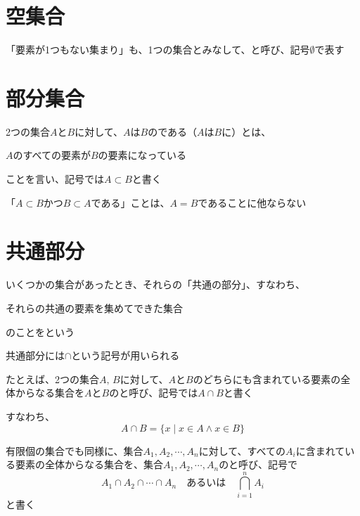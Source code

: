 \documentclass[../book_ronri-and-set]{subfiles}
\begin{document}
\sectionline
\section{空集合}

「要素が1つもない集まり」も、1つの集合とみなして、と呼び、記号$\emptyset$で表す

\sectionline
\section{部分集合}

2つの集合$A$と$B$に対して、$A$は$B$のである（$A$は$B$に）とは、
\begin{shaded*}
  $A$のすべての要素が$B$の要素になっている
\end{shaded*}
ことを言い、記号では$A \subset B$と書く

\br

「$A \subset B$かつ$B \subset A$である」ことは、$A = B$であることに他ならない

\sectionline
\section{共通部分}

いくつかの集合があったとき、それらの「共通の部分」、すなわち、
\begin{shaded*}
  それらの共通の要素を集めてできた集合
\end{shaded*}
のことをという

共通部分には$\cap$という記号が用いられる

\sectionline

たとえば、2つの集合$A,\,B$に対して、$A$と$B$のどちらにも含まれている要素の全体からなる集合を$A$と$B$のと呼び、記号では$A \cap B$と書く

\br

すなわち、
\begin{equation*}
  A \cap B = \{x \mid x \in A \land x \in B\}
\end{equation*}

\sectionline

有限個の集合でも同様に、集合$A_1, A_2, \cdots , A_n$に対して、すべての$A_i$に含まれている要素の全体からなる集合を、集合$A_1, A_2, \cdots , A_n$のと呼び、記号で
\begin{equation*}
  A_1 \cap A_2 \cap \cdots \cap A_n \quad \text{あるいは} \quad \bigcap_{i=1}^n A_i
\end{equation*}
と書く
\end{document}
